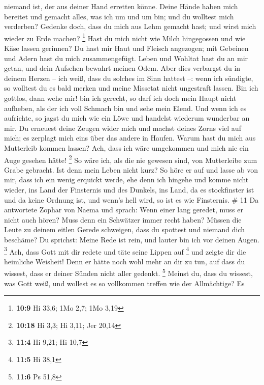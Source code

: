 niemand ist, der aus deiner Hand erretten könne.  Deine
Hände haben mich bereitet und gemacht alles, was ich um und um bin; und
du wolltest mich verderben?  Gedenke doch, dass du mich aus
Lehm gemacht hast; und wirst mich wieder zu Erde machen? \footnote{\textbf{10:9}
  Hi 33,6; 1Mo 2,7; 1Mo 3,19}  Hast du mich nicht wie Milch
hingegossen und wie Käse lassen gerinnen?  Du hast mir Haut
und Fleisch angezogen; mit Gebeinen und Adern hast du mich
zusammengefügt.  Leben und Wohltat hast du an mir getan,
und dein Aufsehen bewahrt meinen Odem.  Aber dies verbargst
du in deinem Herzen -- ich weiß, dass du solches im Sinn hattest --:
 wenn ich sündigte, so wolltest du es bald merken und meine
Missetat nicht ungestraft lassen.  Bin ich gottlos, dann
wehe mir! bin ich gerecht, so darf ich doch mein Haupt nicht aufheben,
als der ich voll Schmach bin und sehe mein Elend.  Und wenn
ich es aufrichte, so jagst du mich wie ein Löwe und handelst wiederum
wunderbar an mir.  Du erneuest deine Zeugen wider mich und
machst deines Zorns viel auf mich; es zerplagt mich eins über das andere
in Haufen.  Warum hast du mich aus Mutterleib kommen
lassen? Ach, dass ich wäre umgekommen und mich nie ein Auge gesehen
hätte! \footnote{\textbf{10:18} Hi 3,3; Hi 3,11; Jer 20,14}
 So wäre ich, als die nie gewesen sind, von Mutterleibe zum
Grabe gebracht.  Ist denn mein Leben nicht kurz? So höre er
auf und lasse ab von mir, dass ich ein wenig erquickt werde,
 ehe denn ich hingehe und komme nicht wieder, ins Land der
Finsternis und des Dunkels,  ins Land, da es stockfinster
ist und da keine Ordnung ist, und wenn's hell wird, so ist es wie
Finsternis. \# 11  Da antwortete Zophar von Naema und
sprach:  Wenn einer lang geredet, muss er nicht auch hören?
Muss denn ein Schwätzer immer recht haben?  Müssen die Leute
zu deinem eitlen Gerede schweigen, dass du spottest und niemand dich
beschäme?  Du sprichst: Meine Rede ist rein, und lauter bin
ich vor deinen Augen. \footnote{\textbf{11:4} Hi 9,21; Hi 10,7}
 Ach, dass Gott mit dir redete und täte seine Lippen auf
\footnote{\textbf{11:5} Hi 38,1}  und zeigte dir die
heimliche Weisheit! Denn er hätte noch wohl mehr an dir zu tun, auf dass
du wissest, dass er deiner Sünden nicht aller gedenkt. \footnote{\textbf{11:6}
  Ps 51,8}  Meinst du, dass du wissest, was Gott weiß, und
wollest es so vollkommen treffen wie der Allmächtige?  Es
